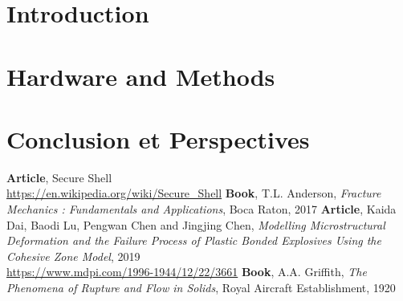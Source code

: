 \documentclass[11pt]{report}
\begin{document}

\printglossary[title={Glossary}, toctitle={Glossary}]


	\listoffigures

    \listoftables

\chapter{Introduction}
    

\chapter{Hardware and Methods}
    

\chapter*{Conclusion et Perspectives}


\begin{thebibliography}{9}%
     \textbf{Article}, Secure Shell\\
    \url{https://en.wikipedia.org/wiki/Secure_Shell}
     \textbf{Book}, T.L. Anderson, \textit{Fracture Mechanics : Fundamentals and Applications}, Boca Raton, 2017
     \textbf{Article}, Kaida Dai, Baodi Lu, Pengwan Chen and Jingjing Chen, \textit{Modelling Microstructural Deformation and the Failure Process of Plastic Bonded Explosives Using the Cohesive Zone Model}, 2019\\
    \url{https://www.mdpi.com/1996-1944/12/22/3661}
     \textbf{Book}, A.A. Griffith, \textit{The Phenomena of Rupture and Flow in Solids}, Royal Aircraft Establishment, 1920
\end{thebibliography} 
\end{document}
